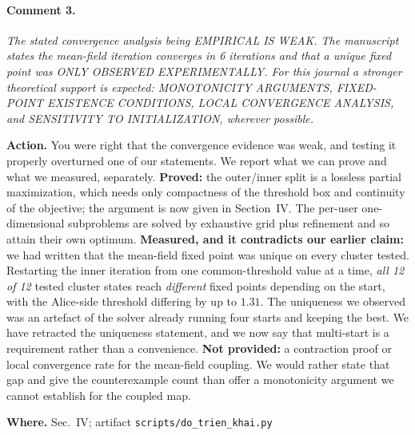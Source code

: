\documentclass[10pt]{article}
\newcommand{\rev}[1]{\par\medskip\noindent\textit{#1}\par\smallskip}
\newcommand{\act}[2]{\noindent\textbf{Action.} #1\par\noindent\textbf{Where.} #2\par}
\begin{document}
\paragraph{Comment 3.}
\rev{The stated convergence analysis being EMPIRICAL IS WEAK. The manuscript states the mean-field iteration converges in 6 iterations and that a unique fixed point was ONLY OBSERVED EXPERIMENTALLY. For this journal a stronger theoretical support is expected: MONOTONICITY ARGUMENTS, FIXED-POINT EXISTENCE CONDITIONS, LOCAL CONVERGENCE ANALYSIS, and SENSITIVITY TO INITIALIZATION, wherever possible.}
\act{You were right that the convergence evidence was weak, and testing it properly overturned one of our statements. We report what we can prove and what we measured, separately. \textbf{Proved:} the outer/inner split is a lossless partial maximization, which needs only compactness of the threshold box and continuity of the objective; the argument is now given in Section~IV. The per-user one-dimensional subproblems are solved by exhaustive grid plus refinement and so attain their own optimum. \textbf{Measured, and it contradicts our earlier claim:} we had written that the mean-field fixed point was unique on every cluster tested. Restarting the inner iteration from one common-threshold value at a time, \emph{all 12 of 12} tested cluster states reach \emph{different} fixed points depending on the start, with the Alice-side threshold differing by up to $1.31$. The uniqueness we observed was an artefact of the solver already running four starts and keeping the best. We have retracted the uniqueness statement, and we now say that multi-start is a requirement rather than a convenience. \textbf{Not provided:} a contraction proof or local convergence rate for the mean-field coupling. We would rather state that gap and give the counterexample count than offer a monotonicity argument we cannot establish for the coupled map.}{Sec.~IV; artifact \texttt{scripts/do\_trien\_khai.py}}
\end{document}
